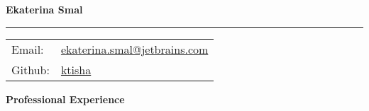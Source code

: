 \documentclass[letterpaper,11pt,oneside]{article}
\begin{document}
\noindent  \LARGE{\textbf{Ekaterina Smal}}  \\
\vspace{-2ex}
{\color{gray}\hrule}

\vspace{2ex}
\normalsize

\noindent \begin{tabular}{@{} l l}
Email:        &  \href{mailto:ekaterina.smal@jetbrains.com }{ekaterina.smal@jetbrains.com }\\
Github:       &  \href{https://github.com/ktisha}{ktisha } \\

\end{tabular}

\vspace{1em}

\noindent \textbf{Professional Experience}

\vspace{1em}
\end{document}
